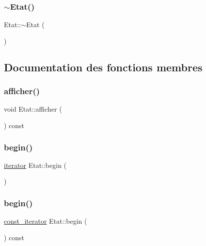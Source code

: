 \subsubsection{\texorpdfstring{$\sim$\+Etat()}{~Etat()}}
{\footnotesize\ttfamily Etat\+::$\sim$\+Etat (\begin{DoxyParamCaption}{ }\end{DoxyParamCaption})}



\subsection{Documentation des fonctions membres}
\mbox{\label{class_etat_aeb0c23cfb166db846e567466dae0ebd1}} 
\subsubsection{\texorpdfstring{afficher()}{afficher()}}
{\footnotesize\ttfamily void Etat\+::afficher (\begin{DoxyParamCaption}{ }\end{DoxyParamCaption}) const}

\mbox{\label{class_etat_ad158b354ea61ec2f0577e801ebdef02d}} 
\subsubsection{\texorpdfstring{begin()}{begin()}\hspace{0.1cm}{\footnotesize\ttfamily [1/2]}}
{\footnotesize\ttfamily \mbox{\hyperlink{class_etat_1_1iterator}{iterator}} Etat\+::begin (\begin{DoxyParamCaption}{ }\end{DoxyParamCaption})\hspace{0.3cm}{\ttfamily [inline]}}

\mbox{\label{class_etat_ac19ab230b9856966eb149364c8045065}} 
\subsubsection{\texorpdfstring{begin()}{begin()}\hspace{0.1cm}{\footnotesize\ttfamily [2/2]}}
{\footnotesize\ttfamily \mbox{\hyperlink{class_etat_1_1const__iterator}{const\+\_\+iterator}} Etat\+::begin (\begin{DoxyParamCaption}{ }\end{DoxyParamCaption}) const\hspace{0.3cm}{\ttfamily [inline]}}

